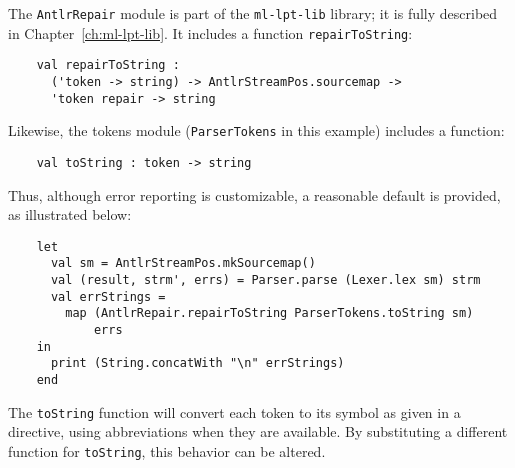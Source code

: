 The {\tt AntlrRepair} module is part of the {\tt ml-lpt-lib} library; it is fully described in Chapter~\ref{ch:ml-lpt-lib}.  It includes a function {\tt repairToString}:
\begin{verbatim}
    val repairToString : 
      ('token -> string) -> AntlrStreamPos.sourcemap -> 
      'token repair -> string

\end{verbatim}
Likewise, the tokens module ({\tt ParserTokens} in this example) includes a function:
\begin{verbatim}
    val toString : token -> string
\end{verbatim}
Thus, although error reporting is customizable, a reasonable default is provided, as illustrated below:
\begin{verbatim}
    let
      val sm = AntlrStreamPos.mkSourcemap()
      val (result, strm', errs) = Parser.parse (Lexer.lex sm) strm
      val errStrings = 
        map (AntlrRepair.repairToString ParserTokens.toString sm)
            errs
    in
      print (String.concatWith "\n" errStrings)
    end
\end{verbatim}
The {\tt toString} function will convert each token to its symbol as given in a  directive, using abbreviations when they are available. By substituting a different function for {\tt toString}, this behavior can be altered.